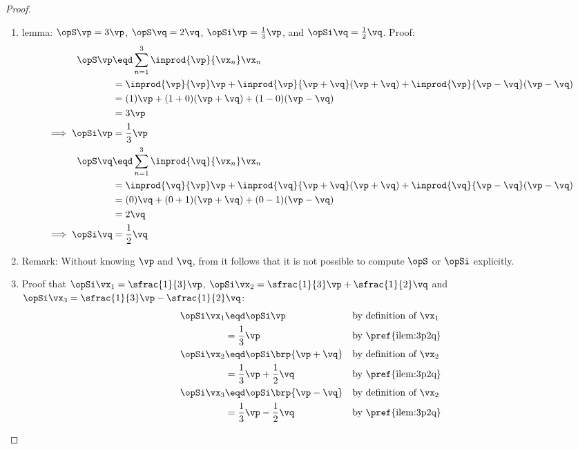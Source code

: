\begin{proof}
\begin{enumerate}
  \item lemma: $\opS\vp=3\vp$, $\opS\vq=2\vq$, $\opSi\vp=\frac{1}{3}\vp$, and $\opSi\vq=\frac{1}{2}\vq$. Proof: \label{ilem:3p2q}
    \begin{align*}
      \opS\vp
        &\eqd \sum_{n=1}^3 \inprod{\vp}{\vx_n}\vx_n
      \\&=    \inprod{\vp}{\vp}\vp + \inprod{\vp}{\vp+\vq}(\vp+\vq) + \inprod{\vp}{\vp-\vq}(\vp-\vq)
      \\&=    (1)\vp + (1+0)(\vp+\vq) + (1-0)(\vp-\vq)
      \\&=    3\vp
      \\\implies \opSi\vp
        &=\frac{1}{3}\vp
      \\
      \opS\vq
        &\eqd \sum_{n=1}^3 \inprod{\vq}{\vx_n}\vx_n
      \\&=    \inprod{\vq}{\vp}\vp + \inprod{\vq}{\vp+\vq}(\vp+\vq) + \inprod{\vq}{\vp-\vq}(\vp-\vq)
      \\&=    (0)\vq + (0+1)(\vp+\vq) + (0-1)(\vp-\vq)
      \\&=    2\vq
      \\\implies \opSi\vq
        &=    \frac{1}{2}\vq
    \end{align*}

   \item Remark: Without knowing $\vp$ and $\vq$, from  it follows that
                 it is not possible to compute $\opS$ or $\opSi$ explicitly.

   \item Proof that $\opSi\vx_1=\sfrac{1}{3}\vp$, $\opSi\vx_2=\sfrac{1}{3}\vp+\sfrac{1}{2}\vq$
         and $\opSi\vx_3=\sfrac{1}{3}\vp-\sfrac{1}{2}\vq$:
     \begin{align*}
       \opSi\vx_1
         &\eqd \opSi\vp
         && \text{by definition of $\vx_1$}
       \\&= \frac{1}{3}\vp
         && \text{by \pref{ilem:3p2q}}
         \\
       \opSi\vx_2
         &\eqd \opSi\brp{\vp+\vq}
         && \text{by definition of $\vx_2$}
       \\&= \frac{1}{3}\vp + \frac{1}{2}\vq
         && \text{by \pref{ilem:3p2q}}
         \\
       \opSi\vx_3
         &\eqd \opSi\brp{\vp-\vq}
         && \text{by definition of $\vx_2$}
       \\&= \frac{1}{3}\vp - \frac{1}{2}\vq
         && \text{by \pref{ilem:3p2q}}
     \end{align*}



\end{enumerate}
\end{proof}
